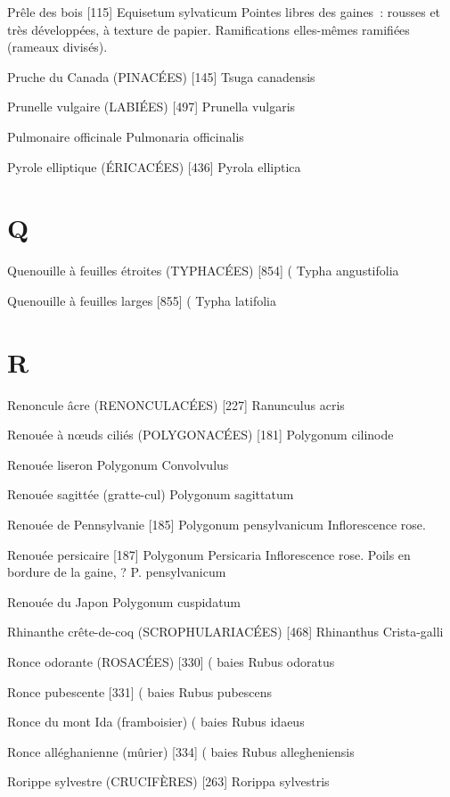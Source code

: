 Prêle des bois  [115]
				Equisetum sylvaticum
Pointes libres des gaines : rousses et très développées, à texture de papier.
Ramifications elles-mêmes ramifiées (rameaux divisés).

Pruche du Canada (PINACÉES)  [145]
				Tsuga canadensis

Prunelle vulgaire (LABIÉES)  [497]
				Prunella vulgaris

Pulmonaire officinale
				Pulmonaria officinalis

Pyrole elliptique (ÉRICACÉES)  [436]
				Pyrola elliptica
\chapter*{Q}

Quenouille à feuilles étroites (TYPHACÉES)  [854]		(
				Typha angustifolia

Quenouille à feuilles larges  [855]					(
				Typha latifolia

\chapter*{R}

Renoncule âcre (RENONCULACÉES)  [227]
				Ranunculus acris

Renouée à nœuds ciliés (POLYGONACÉES)  [181]
				Polygonum cilinode

Renouée liseron
				Polygonum Convolvulus

Renouée sagittée (gratte-cul)
				Polygonum sagittatum


Renouée de Pennsylvanie  [185]
				Polygonum pensylvanicum
Inflorescence rose.

Renouée persicaire  [187]
				Polygonum Persicaria
Inflorescence rose. Poils en bordure de la gaine, ? P. pensylvanicum

Renouée du Japon
				Polygonum cuspidatum

Rhinanthe crête-de-coq (SCROPHULARIACÉES)  [468]
				Rhinanthus Crista-galli

Ronce odorante (ROSACÉES)  [330]			( baies
				Rubus odoratus

Ronce pubescente  [331]					( baies
				Rubus pubescens

Ronce du mont Ida (framboisier)				( baies
				Rubus idaeus


Ronce alléghanienne (mûrier)  [334]				( baies
				Rubus allegheniensis

Rorippe sylvestre (CRUCIFÈRES)  [263]
				Rorippa sylvestris

